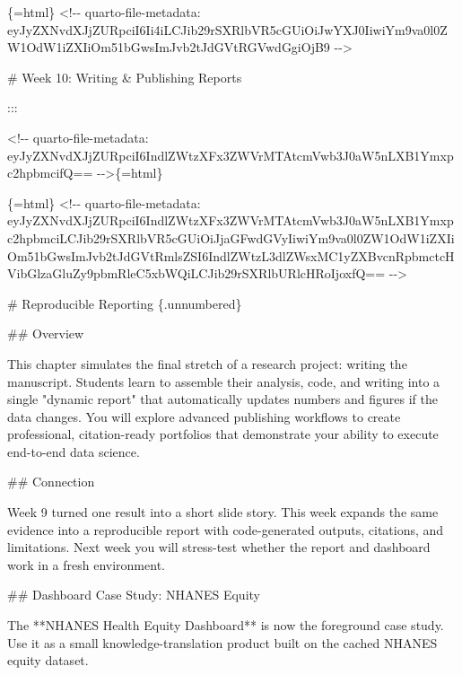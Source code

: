 \documentclass[
  letterpaper,
  DIV=11,
  numbers=noendperiod,
  oneside]{scrreprt}
\newenvironment{Shaded}{\begin{snugshade}}{\end{snugshade}}
\newcommand{\FunctionTok}[1]{\textcolor[rgb]{0.28,0.35,0.67}{#1}}
\newcommand{\InformationTok}[1]{\textcolor[rgb]{0.37,0.37,0.37}{#1}}
\newcommand{\NormalTok}[1]{\textcolor[rgb]{0.00,0.23,0.31}{#1}}
\begin{document}
\begin{Shaded}
\begin{Highlighting}[numbers=left,,]
\InformationTok{\textasciigrave{}\textasciigrave{}\textasciigrave{}\{=html\}}
\InformationTok{\textless{}!{-}{-} quarto{-}file{-}metadata: eyJyZXNvdXJjZURpciI6Ii4iLCJib29rSXRlbVR5cGUiOiJwYXJ0IiwiYm9va0l0ZW1OdW1iZXIiOm51bGwsImJvb2tJdGVtRGVwdGgiOjB9 {-}{-}\textgreater{}}
\InformationTok{\textasciigrave{}\textasciigrave{}\textasciigrave{}}

\FunctionTok{\# Week 10: Writing \& Publishing Reports}


\NormalTok{:::}



\InformationTok{\textasciigrave{}\textless{}!{-}{-} quarto{-}file{-}metadata: eyJyZXNvdXJjZURpciI6IndlZWtzXFx3ZWVrMTAtcmVwb3J0aW5nLXB1Ymxpc2hpbmcifQ== {-}{-}\textgreater{}\textasciigrave{}}\NormalTok{\{=html\}}

\InformationTok{\textasciigrave{}\textasciigrave{}\textasciigrave{}\{=html\}}
\InformationTok{\textless{}!{-}{-} quarto{-}file{-}metadata: eyJyZXNvdXJjZURpciI6IndlZWtzXFx3ZWVrMTAtcmVwb3J0aW5nLXB1Ymxpc2hpbmciLCJib29rSXRlbVR5cGUiOiJjaGFwdGVyIiwiYm9va0l0ZW1OdW1iZXIiOm51bGwsImJvb2tJdGVtRmlsZSI6IndlZWtzL3dlZWsxMC1yZXBvcnRpbmctcHVibGlzaGluZy9pbmRleC5xbWQiLCJib29rSXRlbURlcHRoIjoxfQ== {-}{-}\textgreater{}}
\InformationTok{\textasciigrave{}\textasciigrave{}\textasciigrave{}}

\FunctionTok{\# Reproducible Reporting \{.unnumbered\}}


\FunctionTok{\#\# Overview}

\NormalTok{This chapter simulates the final stretch of a research project: writing the manuscript. Students learn to assemble their analysis, code, and writing into a single "dynamic report" that automatically updates numbers and figures if the data changes. You will explore advanced publishing workflows to create professional, citation{-}ready portfolios that demonstrate your ability to execute end{-}to{-}end data science.}

\FunctionTok{\#\# Connection}

\NormalTok{Week 9 turned one result into a short slide story. This week expands the same evidence into a reproducible report with code{-}generated outputs, citations, and limitations. Next week you will stress{-}test whether the report and dashboard work in a fresh environment.}

\FunctionTok{\#\# Dashboard Case Study: NHANES Equity}

\NormalTok{The **NHANES Health Equity Dashboard** is now the foreground case study. Use it as a small knowledge{-}translation product built on the cached NHANES equity dataset.}


\end{Highlighting}
\end{Shaded}
\end{document}
